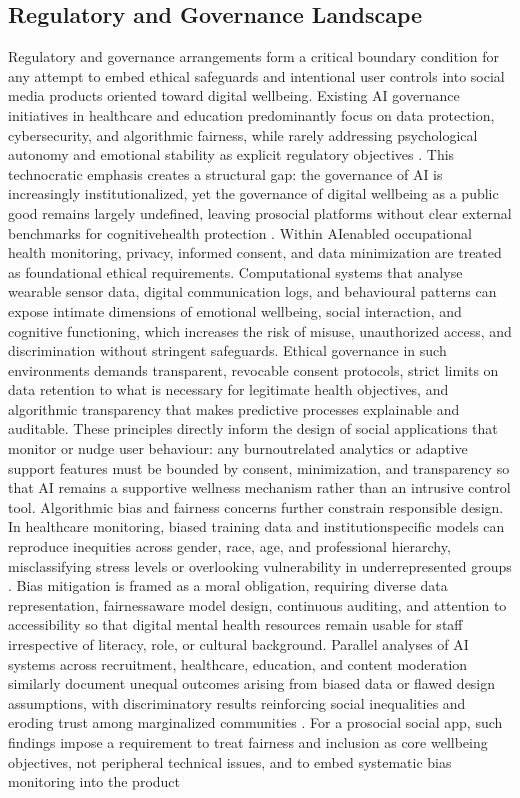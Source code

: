 \documentclass{article}
\begin{document}
\subsection{Regulatory and Governance Landscape}
\label{sec:regulatory_governance_landscape} Regulatory and governance arrangements form a critical boundary condition for any attempt to embed ethical safeguards and intentional user controls into social media products oriented toward digital well\-being. Existing AI governance initiatives in healthcare and education predominantly focus on data protection, cybersecurity, and algorithmic fairness, while rarely addressing psychological autonomy and emotional stability as explicit regulatory objectives \parencites[2]{7808872}. This technocratic emphasis creates a structural gap: the governance of AI is increasingly institutionalized, yet the governance of digital well\-being as a public good remains largely undefined, leaving pro\-social platforms without clear external benchmarks for cognitive\-health protection \parencites[4]{7808872}. Within AI\-enabled occupational health monitoring, privacy, informed consent, and data minimization are treated as foundational ethical requirements. Computational systems that analyse wearable sensor data, digital communication logs, and behavioural patterns can expose intimate dimensions of emotional well\-being, social interaction, and cognitive functioning, which increases the risk of misuse, unauthorized access, and discrimination without stringent safeguards. Ethical governance in such environments demands transparent, revocable consent protocols, strict limits on data retention to what is necessary for legitimate health objectives, and algorithmic transparency that makes predictive processes explainable and auditable. These principles directly inform the design of social applications that monitor or nudge user behaviour: any burnout\-related analytics or adaptive support features must be bounded by consent, minimization, and transparency so that AI remains a supportive wellness mechanism rather than an intrusive control tool. Algorithmic bias and fairness concerns further constrain responsible design. In healthcare monitoring, biased training data and institution\-specific models can reproduce inequities across gender, race, age, and professional hierarchy, misclassifying stress levels or overlooking vulnerability in underrepresented groups \parencites[18]{8760542}. Bias mitigation is framed as a moral obligation, requiring diverse data representation, fairness\-aware model design, continuous auditing, and attention to accessibility so that digital mental health resources remain usable for staff irrespective of literacy, role, or cultural background. Parallel analyses of AI systems across recruitment, healthcare, education, and content moderation similarly document unequal outcomes arising from biased data or flawed design assumptions, with discriminatory results reinforcing social inequalities and eroding trust among marginalized communities \parencites[7]{9300898}. For a pro\-social social app, such findings impose a requirement to treat fairness and inclusion as core well\-being objectives, not peripheral technical issues, and to embed systematic bias monitoring into the product 
\end{document}
